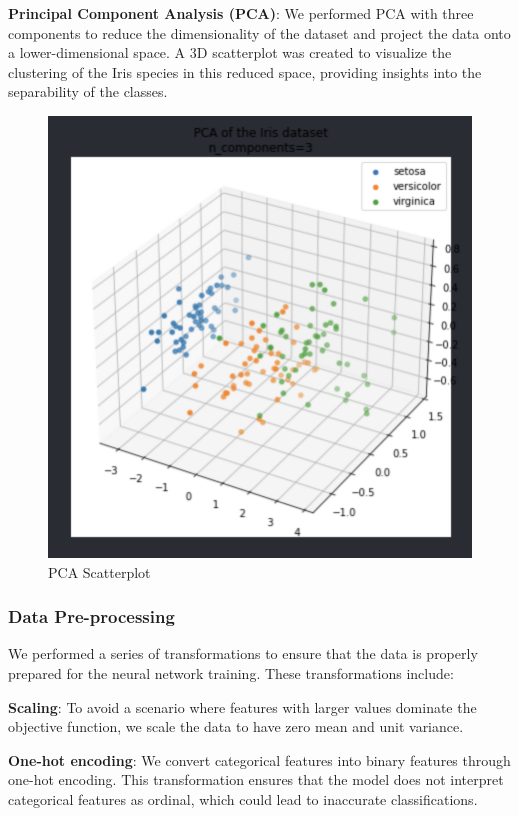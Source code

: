 \documentclass[conference]{inc/IEEEtran}
\begin{document}
\textbf{Principal Component Analysis (PCA)}: We performed PCA with three components to reduce the dimensionality of the dataset
  and project the data onto a lower-dimensional space. A 3D scatterplot was created to visualize the clustering of the Iris
  species in this reduced space, providing insights into the separability of the classes.

  \begin{figure}
    \includegraphics[width=\linewidth]{figures/pca.png}
    \caption{PCA Scatterplot}
    \label{fig:boat1}
  \end{figure}

\subsubsection{Data Pre-processing}

We performed a series of transformations to ensure that the data is properly prepared
for the neural network training. These transformations include:

\textbf{Scaling}: To avoid a scenario where features with larger values dominate the objective function, we scale the data to
    have zero mean and unit variance.
    
\textbf{One-hot encoding}: We convert categorical features into binary features through one-hot encoding. This transformation
    ensures that the model does not interpret categorical features as ordinal, which could lead to inaccurate classifications.
    
\end{document}
